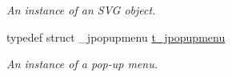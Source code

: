 \begin{DoxyCompactItemize}
\begin{DoxyCompactList}\small\item\em An instance of an SVG object. \item\end{DoxyCompactList}\item 
\hypertarget{group__jgraphics_ga613e147be2f9655726f08f0896b9dbaa}{
typedef struct \_\-jpopupmenu \hyperlink{group__jgraphics_ga613e147be2f9655726f08f0896b9dbaa}{t\_\-jpopupmenu}}
\label{group__jgraphics_ga613e147be2f9655726f08f0896b9dbaa}

\begin{DoxyCompactList}\small\item\em An instance of a pop-\/up menu. \item\end{DoxyCompactList}\end{DoxyCompactItemize}
